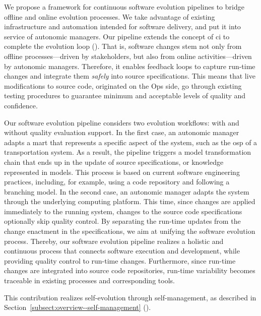 \begin{description}[style=unboxed,leftmargin=0cm,font=\bfseries\normalsize]
	\item[Framework for Continuous Software Evolution Pipelines\autodot]

	We propose a framework for continuous software evolution pipelines to bridge offline and online evolution processes. We take advantage of existing infrastructure and automation intended for software delivery, and put it into service of autonomic managers. Our pipeline extends the concept of \gls{ci} to complete the evolution loop (). That is, software changes stem not only from offline processes---driven by stakeholders, but also from online activities---driven by autonomic managers. Therefore, it enables feedback loops to capture run-time changes and integrate them \emph{safely} into source specifications. This means that live modifications to source code, originated on the Ops side, go through existing testing procedures to guarantee minimum and acceptable levels of quality and confidence.

	Our software evolution pipeline considers two evolution workflows: with and without quality evaluation support. In the first case, an autonomic manager adapts a \gls{mart} that represents a specific aspect of the system, such as the \gls{osp} of a transportation system. As a result, the pipeline triggers a model transformation chain that ends up in the update of source specifications, or knowledge represented in models. This process is based on current software engineering practices, including, for example, using a code repository and following a branching model. In the second case, an autonomic manager adapts the system through the underlying computing platform. This time, since changes are applied immediately to the running system, changes to the source code specifications optionally skip quality control. By separating the run-time updates from the change enactment in the specifications, we aim at unifying the software evolution process. Thereby, our software evolution pipeline realizes a holistic and continuous process that connects software execution and development, while providing quality control to run-time changes. Furthermore, since run-time changes are integrated into source code repositories, run-time variability becomes traceable in existing processes and corresponding tools.

	This contribution realizes self-evolution through self-management, as described in Section~\ref{subsect:overview--self-management} ().


\end{description}
